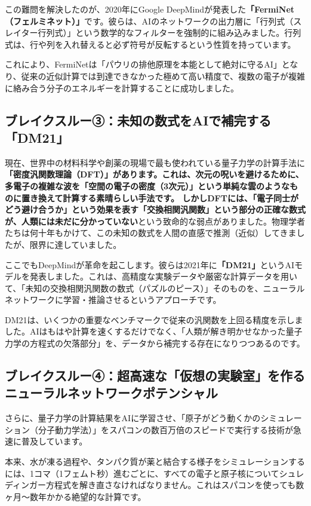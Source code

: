 この難問を解決したのが、2020年にGoogle DeepMindが発表した\textbf{「FermiNet（フェルミネット）」}です。彼らは、AIのネットワークの出力層に「行列式（スレイター行列式）」という数学的なフィルターを強制的に組み込みました。行列式は、行や列を入れ替えると必ず符号が反転するという性質を持っています。

これにより、FermiNetは「パウリの排他原理を本能として絶対に守るAI」となり、従来の近似計算では到達できなかった極めて高い精度で、複数の電子が複雑に絡み合う分子のエネルギーを計算することに成功しました。

\subsection{ブレイクスルー③：未知の数式をAIで補完する「DM21」}

現在、世界中の材料科学や創薬の現場で最も使われている量子力学の計算手法に\textbf{「密度汎関数理論（DFT）」があります。これは、次元の呪いを避けるために、多電子の複雑な波を「空間の電子の密度（3次元）」という単純な雲のようなものに置き換えて計算する素晴らしい手法です。 しかしDFTには、「電子同士がどう避け合うか」という効果を表す「交換相関汎関数」という部分の正確な数式が、人類には未だに分かっていない}という致命的な弱点がありました。物理学者たちは何十年もかけて、この未知の数式を人間の直感で推測（近似）してきましたが、限界に達していました。

ここでもDeepMindが革命を起こします。彼らは2021年に\textbf{「DM21」}というAIモデルを発表しました。これは、高精度な実験データや厳密な計算データを用いて、「未知の交換相関汎関数の数式（パズルのピース）」そのものを、ニューラルネットワークに学習・推論させるというアプローチです。

DM21は、いくつかの重要なベンチマークで従来の汎関数を上回る精度を示しました。AIはもはや計算を速くするだけでなく、「人類が解き明かせなかった量子力学の方程式の欠落部分」を、データから補完する存在になりつつあるのです。

\subsection{ブレイクスルー④：超高速な「仮想の実験室」を作るニューラルネットワークポテンシャル}

さらに、量子力学の計算結果をAIに学習させ、「原子がどう動くかのシミュレーション（分子動力学法）」をスパコンの数百万倍のスピードで実行する技術が急速に普及しています。

本来、水が凍る過程や、タンパク質が薬と結合する様子をシミュレーションするには、1コマ（1フェムト秒）進むごとに、すべての電子と原子核についてシュレディンガー方程式を解き直さなければなりません。これはスパコンを使っても数ヶ月〜数年かかる絶望的な計算です。

